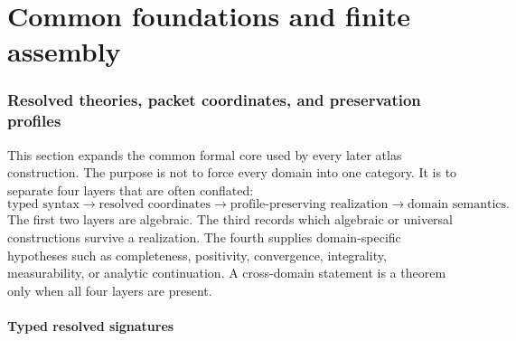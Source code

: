 \documentclass[11pt]{article}
\theoremstyle{definition}
\theoremstyle{remark}
\begin{document}


\part{Common foundations and finite assembly}
\section{Resolved theories, packet coordinates, and preservation profiles}
\label{sec:resolved-foundations}

This section expands the common formal core used by every later atlas construction.  The purpose is not to force every domain into one category.  It is to separate four layers that are often conflated:
\[
\boxed{
\text{typed syntax}
\longrightarrow
\text{resolved coordinates}
\longrightarrow
\text{profile-preserving realization}
\longrightarrow
\text{domain semantics}.}
\]
The first two layers are algebraic.  The third records which algebraic or universal constructions survive a realization.  The fourth supplies domain-specific hypotheses such as completeness, positivity, convergence, integrality, measurability, or analytic continuation.  A cross-domain statement is a theorem only when all four layers are present.

\subsection{Typed resolved signatures}
\label{subsec:typed-resolved-signatures}
\end{document}
